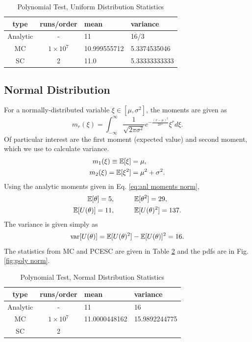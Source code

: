 \begin{table}
\begin{center}
\begin{tabular}{c c|l l}
type & runs/order & mean & variance \\ \hline
Analytic & - & 11 & 16/3 \\
MC & $1\times10^7$ & 10.999555712 & 5.3374535046 \\
SC & 2 & 11.0 & 5.33333333333 \\
\end{tabular}
\end{center}
\caption{Polynomial Test, Uniform Distribution Statistics}
\label{tab:poly uniform}
\end{table}

\subsection{Normal Distribution}
For a normally-distributed variable $\xi\in[\mu,\sigma^2]$, the moments are given as
\begin{equation}
m_r(\xi)=\int_{-\infty}^\infty \frac{1}{\sqrt{2\pi\sigma^2}}e^{-\frac{(x-\mu)^2}{2\sigma^2}}\xi^r d\xi.
\end{equation}
Of particular interest are the first moment (expected value) and second moment, which we use to calculate variance.
\begin{align}\label{eq:anl moments norm}
m_1(\xi)\equiv\mathbb{E}[ \xi]&=\mu,\\
m_2(\xi)=\mathbb{E}[ \xi^2]&=\mu^2+\sigma^2.
\end{align}
Using the analytic moments given in Eq. \ref{eq:anl moments norm},
\begin{align}
\mathbb{E}[ \theta] = 5, &\hspace{30pt}\mathbb{E}[ \theta^2]=29,\\
\mathbb{E}[ U(\theta)]=11, &\hspace{30pt}\mathbb{E}[ U(\theta)^2]=137.
\end{align}
The variance is given simply as
\begin{equation}
\text{var}[U(\theta)]=\mathbb{E}[ U(\theta)^2]-\mathbb{E}[ U(\theta)]^2=16.
\end{equation}
The statistics from MC and PCESC are given in Table \ref{tab:poly normal} and the pdfs are in Fig. \ref{fig:poly norm}.

\begin{table}
\begin{center}
\begin{tabular}{c c|l l}
type & runs/order & mean & variance \\ \hline
Analytic & - & 11 & 16 \\
MC & $1\times10^7$ & 11.0000448162 & 15.9892244775 \\
SC & 2 & & \\
\end{tabular}
\end{center}
\caption{Polynomial Test, Normal Distribution Statistics}
\label{tab:poly normal}
\end{table}

